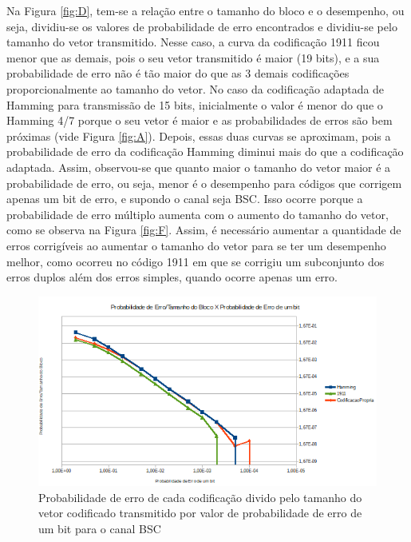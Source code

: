 \documentclass[journal,comsoc]{IEEEtran}
\begin{document}
		Na Figura \ref{fig:D}, tem-se a relação entre o tamanho do bloco e o desempenho, ou seja, dividiu-se os valores de probabilidade de erro encontrados e dividiu-se pelo tamanho do vetor transmitido. Nesse caso, a curva da codificação 1911 ficou menor que as demais, pois o seu vetor transmitido é maior (19 bits), e a sua probabilidade de erro não é tão maior do que as	3 demais codificações proporcionalmente ao tamanho do vetor. No caso da codificação adaptada de Hamming para transmissão de 15 bits, inicialmente o valor é menor do que o Hamming 4/7 porque o seu vetor é maior e as probabilidades	de erros são bem próximas (vide Figura \ref{fig:A}). Depois, essas duas curvas se aproximam, pois a probabilidade de erro da codificação Hamming diminui mais do que a codificação adaptada. Assim, observou-se que quanto maior o tamanho do vetor maior é a probabilidade de erro, ou seja, menor é o desempenho para códigos que corrigem apenas um bit de erro, e supondo o canal seja BSC. Isso ocorre porque a probabilidade de erro múltiplo aumenta com o aumento do tamanho do vetor, como se observa na Figura \ref{fig:F}. Assim, é necessário aumentar a quantidade de erros corrigíveis ao aumentar o tamanho do vetor para se ter um desempenho melhor, como ocorreu no código 1911 em que se corrigiu um subconjunto dos erros duplos além dos erros simples, quando ocorre apenas um erro.
		
		\begin{figure}[hbt]
			\centering
			\includegraphics[width=\columnwidth]{../img/Tamanho_Desempenho.png}%
			\caption{Probabilidade de erro de cada codificação divido pelo tamanho do vetor codificado transmitido por valor de probabilidade de erro de um bit para o canal BSC}%
			\label{fig:E}%
		\end{figure}
	
\end{document}
